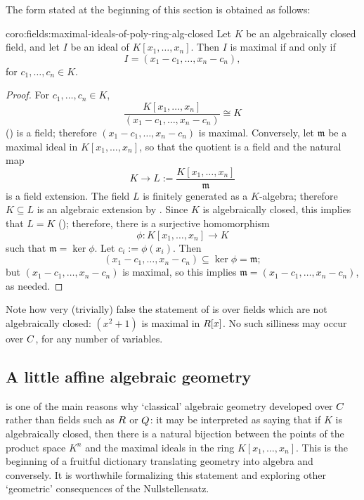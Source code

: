 The form stated at the beginning of this section is obtained as
follows:
\begin{coro}{}{coro:fields:maximal-ideals-of-poly-ring-alg-closed}
  Let $K$ be an algebraically closed field, and let $I$ be an ideal of
  $K[x_1, \dots, x_n]$. Then $I$ is maximal if and only if
  \[
    I = (x_1 - c_1, \dots, x_n - c_n),
  \]
  for $c_1, \dots, c_n \in K$.
\end{coro}
\begin{proof}
  For $c_1, \dots, c_n \in K$,
  \[
    \frac{K[x_1, \dots, x_n]}{(x_1 - c_1, \dots, x_n - c_n)} \cong K
  \]
  () is a field;
  therefore $(x_1 - c_1, \dots, x_n - c_n)$ is maximal. Conversely,
  let $\mathfrak{m}$ be a maximal ideal in $K[x_1, \dots, x_n]$, so
  that the quotient is a field and the natural map
  \[
    K \to L := \frac{K[x_1, \dots, x_n]}{\mathfrak{m}}
  \]
  is a field extension. The field $L$ is finitely generated as a
  $K$-algebra; therefore $K \subseteq L$ is an algebraic extension by
  . Since $K$ is algebraically closed, this
  implies that $L = K$ (); therefore, there is a
  surjective homomorphism
  \[
    \phi : K[x_1, \dots, x_n] \to K
  \]
  such that $\mathfrak{m} = \ker\phi$. Let $c_i := \phi(x_i)$. Then
  \[
    (x_1 - c_1, \dots, x_n - c_n) \subseteq \ker\phi = \mathfrak{m};
  \]
  but $(x_1 - c_1, \dots, x_n - c_n)$ is maximal, so this implies
  $\mathfrak{m} = (x_1 - c_1, \dots, x_n - c_n)$, as needed.
\end{proof}
Note how very (trivially) false the statement of
 is over fields which are not algebraically
closed: $(x^2 + 1)$ is maximal in $R[x]$. No such silliness may occur
over $C$, for any number of variables.

\subsection{A little affine algebraic geometry}%
\label{subsec:fields:a-little-affine-algebraic-geometry}
 is one of the main reasons why `classical'
algebraic geometry developed over $C$ rather than fields such as $R$
or $Q$: it may be interpreted as saying that if $K$ is algebraically
closed, then there is a natural bijection between the points of the
product space $K^n$ and the maximal ideals in the ring
$K[x_1, \dots, x_n]$. This is the beginning of a fruitful dictionary
translating geometry into algebra and conversely. It is worthwhile
formalizing this statement and exploring other `geometric'
consequences of the Nullstellensatz.

